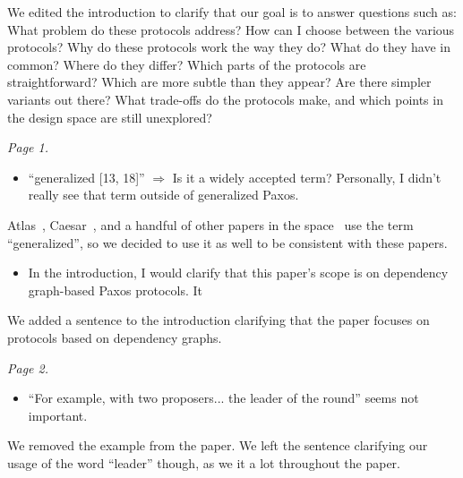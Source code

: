 \documentclass[letterpaper,twocolumn,10pt]{article}
\newenvironment{reviewerquote}
{\list{}{\leftmargin=\parindent\rightmargin=0in}\item[] \itshape \color{ReviewerDarkGray}}%
{\endlist}
\begin{document}
We edited the introduction to clarify that our goal is to answer questions such
as: What problem do these protocols address? How can I choose between the
various protocols? Why do these protocols work the way they do? What do they
have in common? Where do they differ? Which parts of the protocols are
straightforward? Which are more subtle than they appear? Are there simpler
variants out there? What trade-offs do the protocols make, and which points in
the design space are still unexplored?

\begin{reviewerquote}
  Page 1.

  \begin{itemize}
    \item
      ``generalized [13, 18]'' $\Rightarrow$ Is it a widely accepted term?
      Personally, I didn't really see that term outside of generalized Paxos.
  \end{itemize}
\end{reviewerquote}

Atlas~\cite{enes2020state}, Caesar~\cite{arun2017speeding}, and a handful of
other papers in the space~\cite{sutra2011fast, losa2016brief} use the term
``generalized'', so we decided to use it as well to be consistent with these
papers.

\begin{reviewerquote}
  \begin{itemize}
    \item
      In the introduction, I would clarify that this paper's scope is on
      dependency graph-based Paxos protocols. It
  \end{itemize}
\end{reviewerquote}

We added a sentence to the introduction clarifying that the paper focuses on
protocols based on dependency graphs.

\begin{reviewerquote}
  Page 2.

  \begin{itemize}
    \item
      ``For example, with two proposers... the leader of the round'' seems not
      important.
  \end{itemize}
\end{reviewerquote}

We removed the example from the paper. We left the sentence clarifying our
usage of the word ``leader'' though, as we it a lot throughout the paper.
\end{document}
